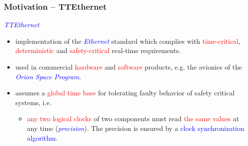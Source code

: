 \documentclass[serif]{beamer}
\begin{document}



\begin{frame}\frametitle{\textbf{Motivation -- TTEthernet}}
\emph{\textcolor{blue}{TTEthernet}}  
\begin{itemize}
\item implementation of the \emph{\textcolor{blue}{Ethernet}} standard which complies with
\textcolor{red}{time-critical}, \textcolor{red}{deterministic} and \textcolor{red}{safety-critical} real-time requirements.

\item used in commercial \textcolor{red}{hardware} and \textcolor{red}{software} products,
e.g. the avionics of the \emph{\textcolor{blue}{Orion Space Program}}.

\item assumes a \textcolor{red}{global time base} for tolerating faulty behavior of safety critical systems, i.e.
	\begin{itemize}
		\item  \textcolor{red}{any two logical clocks} of two
						components must read \textcolor{red}{the same values} at any time (\emph{\textcolor{blue}{precision}}). 
						The precision is ensured by a \textcolor{blue}{clock synchronization algorithm}.
	\end{itemize}
\end{itemize}
\end{frame} 
 
\end{document}
